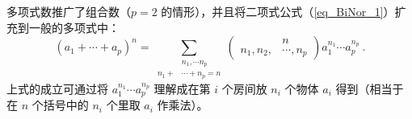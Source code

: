 多项式数推广了组合数（$p=2$ 的情形），并且将二项式公式（\autoref{eq_BiNor_1}）扩充到一般的多项式中：
\begin{equation}
(a_1+\cdots+a_p)^n=\sum_{\begin{aligned}
&n_1,\cdots n_p\\
n_1+&\cdots+n_p=n
\end{aligned}}\left(\begin{aligned}
&n\\n_1,n_2,&\cdots,n_p
\end{aligned}\right)a_1^{n_1}\cdots a_p^{n_p}~.
\end{equation}
上式的成立可通过将 $a_1^{n_1}\cdots a_p^{n_p}$ 理解成在第 $i$ 个房间放 $n_i$ 个物体 $a_i$ 得到（相当于在 $n$ 个括号中的 $n_i$ 个里取 $a_i$ 作乘法）。
